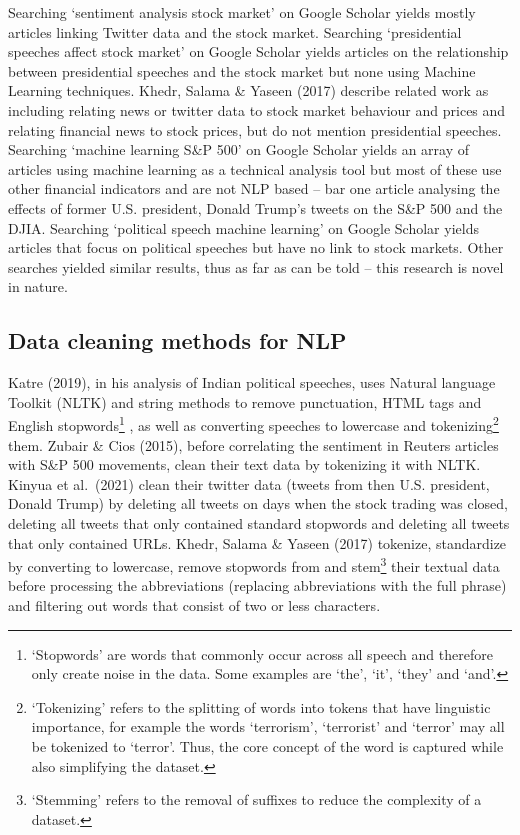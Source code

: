 \documentclass[11pt,preprint, authoryear]{elsarticle}
\numberwithin{equation}{section}
\numberwithin{figure}{section}
\numberwithin{table}{section}
\let\rmarkdownfootnote\footnote%
\def\footnote{\protect\rmarkdownfootnote}
\begin{document}
Searching `sentiment analysis stock market' on Google Scholar yields
mostly articles linking Twitter data and the stock market. Searching
`presidential speeches affect stock market' on Google Scholar yields
articles on the relationship between presidential speeches and the stock
market but none using Machine Learning techniques. Khedr, Salama \&
Yaseen (2017) describe related work as including relating news or
twitter data to stock market behaviour and prices and relating financial
news to stock prices, but do not mention presidential speeches.
Searching `machine learning S\&P 500' on Google Scholar yields an array
of articles using machine learning as a technical analysis tool but most
of these use other financial indicators and are not NLP based -- bar one
article analysing the effects of former U.S. president, Donald Trump's
tweets on the S\&P 500 and the DJIA. Searching `political speech machine
learning' on Google Scholar yields articles that focus on political
speeches but have no link to stock markets. Other searches yielded
similar results, thus as far as can be told -- this research is novel in
nature.

\hypertarget{data-cleaning-methods-for-nlp}{%
\subsection{Data cleaning methods for
NLP}\label{data-cleaning-methods-for-nlp}}

Katre (2019), in his analysis of Indian political speeches, uses Natural
language Toolkit (NLTK) and string methods to remove punctuation, HTML
tags and English stopwords\footnote{`Stopwords' are words that commonly
  occur across all speech and therefore only create noise in the data.
  Some examples are `the', `it', `they' and `and'.} , as well as
converting speeches to lowercase and tokenizing\footnote{`Tokenizing'
  refers to the splitting of words into tokens that have linguistic
  importance, for example the words `terrorism', `terrorist' and
  `terror' may all be tokenized to `terror'. Thus, the core concept of
  the word is captured while also simplifying the dataset.} them. Zubair
\& Cios (2015), before correlating the sentiment in Reuters articles
with S\&P 500 movements, clean their text data by tokenizing it with
NLTK. Kinyua et al.~(2021) clean their twitter data (tweets from then
U.S. president, Donald Trump) by deleting all tweets on days when the
stock trading was closed, deleting all tweets that only contained
standard stopwords and deleting all tweets that only contained URLs.
Khedr, Salama \& Yaseen (2017) tokenize, standardize by converting to
lowercase, remove stopwords from and stem\footnote{`Stemming' refers to
  the removal of suffixes to reduce the complexity of a dataset.} their
textual data before processing the abbreviations (replacing
abbreviations with the full phrase) and filtering out words that consist
of two or less characters.
\end{document}
